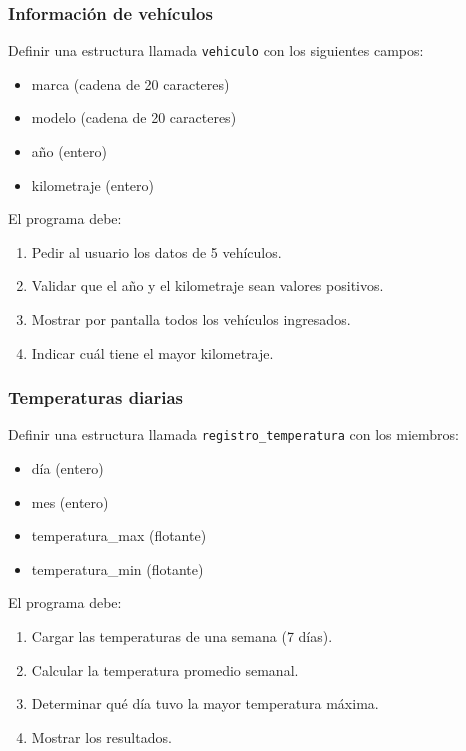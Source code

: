 \subsubsection{Información de vehículos}

Definir una estructura llamada \texttt{vehiculo} con los siguientes campos:

\begin{itemize}
\item marca (cadena de 20 caracteres)
\item modelo (cadena de 20 caracteres)
\item año (entero)
\item kilometraje (entero)
\end{itemize}

El programa debe:

\begin{enumerate}
\item Pedir al usuario los datos de 5 vehículos.
\item Validar que el año y el kilometraje sean valores positivos.
\item Mostrar por pantalla todos los vehículos ingresados.
\item Indicar cuál tiene el mayor kilometraje.
\end{enumerate}

\subsubsection{Temperaturas diarias}

Definir una estructura llamada \texttt{registro\_temperatura} con los miembros:

\begin{itemize}
\item día (entero)
\item mes (entero)
\item temperatura\_max (flotante)
\item temperatura\_min (flotante)
\end{itemize}

El programa debe:

\begin{enumerate}
\item Cargar las temperaturas de una semana (7 días).
\item Calcular la temperatura promedio semanal.
\item Determinar qué día tuvo la mayor temperatura máxima.
\item Mostrar los resultados.
\end{enumerate}

